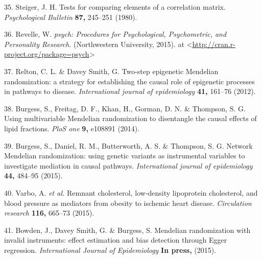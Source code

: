 \documentclass[]{article}
\begin{document}
\hypertarget{ref-Steiger1980}{}
35. Steiger, J. H. Tests for comparing elements of a correlation matrix.
\emph{Psychological Bulletin} \textbf{87,} 245--251 (1980).

\hypertarget{ref-Revelle2015}{}
36. Revelle, W. \emph{psych: Procedures for Psychological, Psychometric,
and Personality Research}. (Northwestern University, 2015). at
\textless{}\url{http://cran.r-project.org/package=psych}\textgreater{}

\hypertarget{ref-Relton2012}{}
37. Relton, C. L. \& Davey Smith, G. Two-step epigenetic Mendelian
randomization: a strategy for establishing the causal role of epigenetic
processes in pathways to disease. \emph{International journal of
epidemiology} \textbf{41,} 161--76 (2012).

\hypertarget{ref-Burgess2014a}{}
38. Burgess, S., Freitag, D. F., Khan, H., Gorman, D. N. \& Thompson, S.
G. Using multivariable Mendelian randomization to disentangle the causal
effects of lipid fractions. \emph{PloS one} \textbf{9,} e108891 (2014).

\hypertarget{ref-Burgess2015}{}
39. Burgess, S., Daniel, R. M., Butterworth, A. S. \& Thompson, S. G.
Network Mendelian randomization: using genetic variants as instrumental
variables to investigate mediation in causal pathways.
\emph{International journal of epidemiology} \textbf{44,} 484--95
(2015).

\hypertarget{ref-Varbo2015}{}
40. Varbo, A. \emph{et al.} Remnant cholesterol, low-density lipoprotein
cholesterol, and blood pressure as mediators from obesity to ischemic
heart disease. \emph{Circulation research} \textbf{116,} 665--73 (2015).

\hypertarget{ref-Bowden2015}{}
41. Bowden, J., Davey Smith, G. \& Burgess, S. Mendelian randomization
with invalid instruments: effect estimation and bias detection through
Egger regression. \emph{International Journal of Epidemiology}
\textbf{In press,} (2015).
\end{document}
